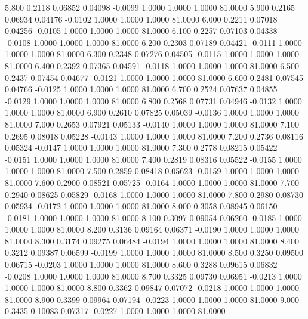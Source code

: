    5.800   0.2118   0.06852   0.04098  -0.0099   1.0000   1.0000   1.0000  81.0000
   5.900   0.2165   0.06934   0.04176  -0.0102   1.0000   1.0000   1.0000  81.0000
   6.000   0.2211   0.07018   0.04256  -0.0105   1.0000   1.0000   1.0000  81.0000
   6.100   0.2257   0.07103   0.04338  -0.0108   1.0000   1.0000   1.0000  81.0000
   6.200   0.2303   0.07189   0.04421  -0.0111   1.0000   1.0000   1.0000  81.0000
   6.300   0.2348   0.07276   0.04505  -0.0115   1.0000   1.0000   1.0000  81.0000
   6.400   0.2392   0.07365   0.04591  -0.0118   1.0000   1.0000   1.0000  81.0000
   6.500   0.2437   0.07454   0.04677  -0.0121   1.0000   1.0000   1.0000  81.0000
   6.600   0.2481   0.07545   0.04766  -0.0125   1.0000   1.0000   1.0000  81.0000
   6.700   0.2524   0.07637   0.04855  -0.0129   1.0000   1.0000   1.0000  81.0000
   6.800   0.2568   0.07731   0.04946  -0.0132   1.0000   1.0000   1.0000  81.0000
   6.900   0.2610   0.07825   0.05039  -0.0136   1.0000   1.0000   1.0000  81.0000
   7.000   0.2653   0.07921   0.05133  -0.0140   1.0000   1.0000   1.0000  81.0000
   7.100   0.2695   0.08018   0.05228  -0.0143   1.0000   1.0000   1.0000  81.0000
   7.200   0.2736   0.08116   0.05324  -0.0147   1.0000   1.0000   1.0000  81.0000
   7.300   0.2778   0.08215   0.05422  -0.0151   1.0000   1.0000   1.0000  81.0000
   7.400   0.2819   0.08316   0.05522  -0.0155   1.0000   1.0000   1.0000  81.0000
   7.500   0.2859   0.08418   0.05623  -0.0159   1.0000   1.0000   1.0000  81.0000
   7.600   0.2900   0.08521   0.05725  -0.0164   1.0000   1.0000   1.0000  81.0000
   7.700   0.2940   0.08625   0.05829  -0.0168   1.0000   1.0000   1.0000  81.0000
   7.800   0.2980   0.08730   0.05934  -0.0172   1.0000   1.0000   1.0000  81.0000
   8.000   0.3058   0.08945   0.06150  -0.0181   1.0000   1.0000   1.0000  81.0000
   8.100   0.3097   0.09054   0.06260  -0.0185   1.0000   1.0000   1.0000  81.0000
   8.200   0.3136   0.09164   0.06371  -0.0190   1.0000   1.0000   1.0000  81.0000
   8.300   0.3174   0.09275   0.06484  -0.0194   1.0000   1.0000   1.0000  81.0000
   8.400   0.3212   0.09387   0.06599  -0.0199   1.0000   1.0000   1.0000  81.0000
   8.500   0.3250   0.09500   0.06715  -0.0203   1.0000   1.0000   1.0000  81.0000
   8.600   0.3288   0.09615   0.06832  -0.0208   1.0000   1.0000   1.0000  81.0000
   8.700   0.3325   0.09730   0.06951  -0.0213   1.0000   1.0000   1.0000  81.0000
   8.800   0.3362   0.09847   0.07072  -0.0218   1.0000   1.0000   1.0000  81.0000
   8.900   0.3399   0.09964   0.07194  -0.0223   1.0000   1.0000   1.0000  81.0000
   9.000   0.3435   0.10083   0.07317  -0.0227   1.0000   1.0000   1.0000  81.0000
